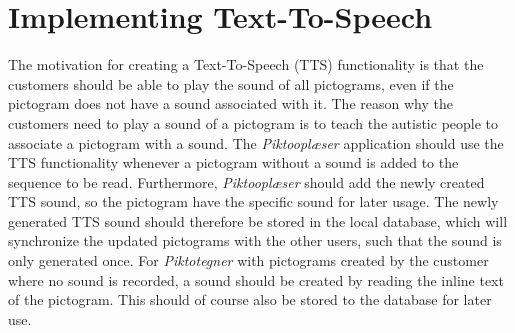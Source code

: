 \section{Implementing Text-To-Speech}
The motivation for creating a Text-To-Speech (TTS) functionality is that the customers should be able to play the sound of all pictograms, even if the pictogram does not have a sound associated with it.
The reason why the customers need to play a sound of a pictogram is to teach the autistic people to associate a pictogram with a sound.
The \textit{Piktooplæser} application should use the TTS functionality whenever a pictogram without a sound is added to the sequence to be read.
Furthermore, \textit{Piktooplæser} should add the newly created TTS sound, so the pictogram have the specific sound for later usage. The newly generated TTS sound should therefore be stored in the local database, which will synchronize the updated pictograms with the other users, such that the sound is only generated once.
For \textit{Piktotegner} with pictograms created by the customer where no sound is recorded, a sound should be created by reading the inline text of the pictogram. This should of course also be stored to the database for later use.